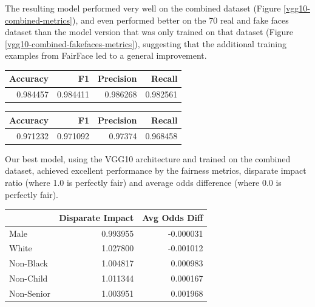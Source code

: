 \documentclass[11pt, letterpaper]{article}
\newenvironment{Figure}
  {\par\medskip\noindent\minipage{\linewidth}}
  {\endminipage\par\medskip}
\begin{document}
\begin{multicols}{2}
  The resulting model performed very well on the combined dataset (Figure
  \ref{vgg10-combined-metrics}), and even performed better on the 70 real and
  fake faces dataset than the model version that was only trained on that
  dataset (Figure \ref{vgg10-combined-fakefaces-metrics}), suggesting that the
  additional training examples from FairFace led to a general improvement.

  \begin{Figure}
    \centering
    \label{vgg10-combined-metrics}
    \begin{tabular}{rrrr}
    \toprule
    Accuracy &        F1 &  Precision &    Recall \\
    \midrule
    0.984457 &  0.984411 &   0.986268 &  0.982561 \\
    \bottomrule
    \end{tabular}
  \end{Figure}

  \begin{Figure}
    \centering
    \label{vgg10-combined-fakefaces-metrics}
    \begin{tabular}{rrrr}
    \toprule
     Accuracy &        F1 &  Precision &    Recall \\
    \midrule
     0.971232 &  0.971092 &    0.97374 &  0.968458 \\
    \bottomrule
    \end{tabular}
    \end{Figure}

  Our best model, using the VGG10 architecture and trained on the combined
  dataset, achieved excellent performance by the fairness metrics, disparate
  impact ratio (where 1.0 is perfectly fair) and average odds difference
  (where 0.0 is perfectly fair).

    \begin{Figure}
      \centering
      \label{fairnessmetrics}
      \begin{tabular}{lrr}
      \toprule
      {} &  Disparate Impact &  Avg Odds Diff \\
      \midrule
      Male       &                0.993955 &                -0.000031 \\
      White      &                1.027800 &                -0.001012 \\
      Non-Black  &                1.004817 &                 0.000983 \\
      Non-Child  &                1.011344 &                 0.000167 \\
      Non-Senior &                1.003951 &                 0.001968 \\
      \bottomrule
      \end{tabular}
      \end{Figure}


\end{multicols}
\end{document}
